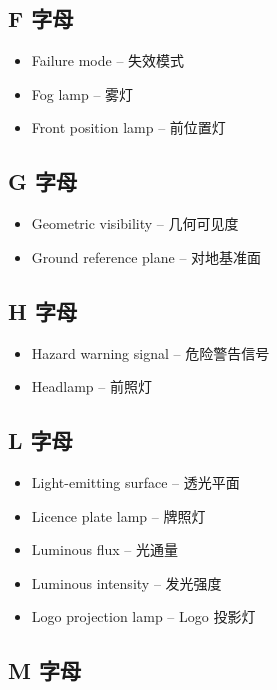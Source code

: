 \subsection{F 字母}

\begin{itemize}[leftmargin=2em]
    \item Failure mode -- 失效模式
    \item Fog lamp -- 雾灯
    \item Front position lamp -- 前位置灯
\end{itemize}

\subsection{G 字母}

\begin{itemize}[leftmargin=2em]
    \item Geometric visibility -- 几何可见度
    \item Ground reference plane -- 对地基准面
\end{itemize}

\subsection{H 字母}

\begin{itemize}[leftmargin=2em]
    \item Hazard warning signal -- 危险警告信号
    \item Headlamp -- 前照灯
\end{itemize}

\subsection{L 字母}

\begin{itemize}[leftmargin=2em]
    \item Light-emitting surface -- 透光平面
    \item Licence plate lamp -- 牌照灯
    \item Luminous flux -- 光通量
    \item Luminous intensity -- 发光强度
    \item Logo projection lamp -- Logo 投影灯
\end{itemize}

\subsection{M 字母}

